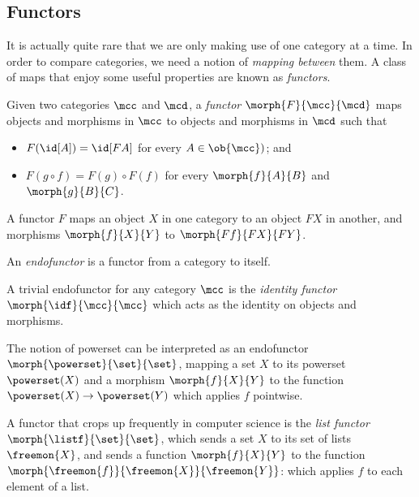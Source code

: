 \subsection{Functors}

It is actually quite rare that we are only making use of one category at a time.
In order to compare categories, we need a notion of \emph{mapping between} them.
A class of maps that enjoy some useful properties are known as \emph{functors}.

\begin{definition}[Functor]
    Given two categories \(\mcc\) and \(\mcd\), a \emph{functor} \(
        \morph{F}{\mcc}{\mcd}
    \) maps objects and morphisms in \(\mcc\) to objects and morphisms in
    \(\mcd\) such that
    \begin{itemize}
        \item \(F(\id[A]) = \id[FA]\) for every \(A \in \ob{\mcc})\); and
        \item \(F(g \circ f) = F(g) \circ F(f)\) for every \(\morph{f}{A}{B}\)
        and \(\morph{g}{B}{C}\).
    \end{itemize}
\end{definition}

A functor \(F\) maps an object \(X\) in one category to an object \(FX\) in
another, and morphisms \(\morph{f}{X}{Y}\) to
\(\morph{Ff}{FX}{FY}\).

\begin{definition}[Endofunctor]
    An \emph{endofunctor} is a functor from a category to itself.
\end{definition}

\begin{example}
    A trivial endofunctor for any category \(\mcc\) is the
    \emph{identity functor} \(\morph{\idf}{\mcc}{\mcc}\) which acts as the
    identity on objects and morphisms.
\end{example}

\begin{example}
    The notion of powerset can be interpreted as an endofunctor \(
        \morph{\powerset}{\set}{\set}
    \), mapping a set \(X\) to its powerset \(\powerset(X)\) and a morphism
    \(\morph{f}{X}{Y}\) to the function \(\powerset(X) \to \powerset(Y)\) which
    applies \(f\) pointwise.
\end{example}

\begin{example}\label{ex:list-functor}
    A functor that crops up frequently in computer science is the
    \emph{list functor} \(\morph{\listf}{\set}{\set}\), which sends a set
    \(X\) to its set of lists \(\freemon{X}\), and sends a function
    \(\morph{f}{X}{Y}\) to the function
    \(\morph{\freemon{f}}{\freemon{X}}{\freemon{Y}}\): which applies \(f\)
    to each element of a list.
\end{example}

